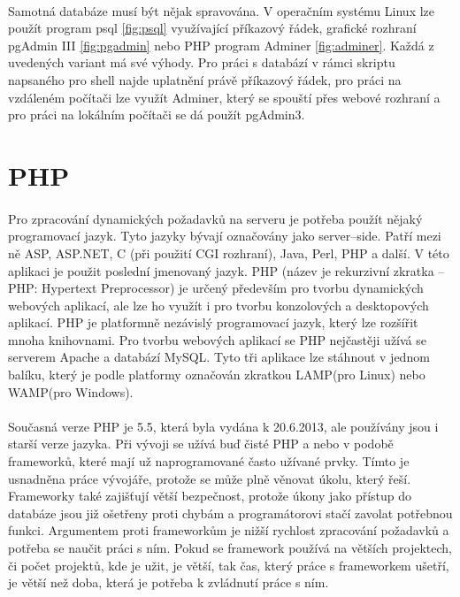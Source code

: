 \documentclass[11pt,a4paper,titlepage,oneside]{book}
\begin{document}

		\paragraph{}Samotná databáze musí být nějak spravována. V operačním systému Linux lze použít program psql \ref{fig:psql} využívající příkazový řádek, grafické rozhraní pgAdmin III \ref{fig:pgadmin} nebo PHP program Adminer \ref{fig:adminer}. Každá z uvedených variant má své výhody. Pro práci s databází v rámci skriptu napsaného pro shell najde uplatnění právě příkazový řádek, pro práci na vzdáleném počítači lze využít Adminer, který se spouští přes webové rozhraní a pro práci na lokálním počítači se dá použít pgAdmin3.




	\section{PHP}
		\paragraph{} Pro zpracování dynamických požadavků na serveru je potřeba použít nějaký programovací jazyk. Tyto jazyky bývají označovány jako server--side. Patří mezi ně ASP, ASP.NET, C (při použití CGI rozhraní), Java, Perl, PHP a další. V této aplikaci je použit poslední jmenovaný jazyk. PHP (název je rekurzivní zkratka -- PHP: Hypertext Preprocessor) je určený především pro tvorbu dynamických webových aplikací, ale lze ho využít i pro tvorbu konzolových a desktopových aplikací. PHP je platformně nezávislý programovací jazyk, který lze rozšířit mnoha knihovnami. Pro tvorbu webových aplikací se PHP nejčastěji užívá se serverem Apache a databází MySQL. Tyto tři aplikace lze stáhnout v jednom balíku, který je podle platformy označován zkratkou LAMP(pro Linux) nebo WAMP(pro Windows).


		\paragraph{} Současná verze PHP je 5.5, která byla vydána k 20.6.2013, ale používány jsou i starší verze jazyka. Při vývoji se užívá buď čisté PHP a nebo v podobě frameworků, které mají už naprogramované často užívané prvky. Tímto je usnadněna práce vývojáře, protože se může plně věnovat úkolu, který řeší. Frameworky také zajišťují větší bezpečnost, protože úkony jako přístup do databáze jsou již ošetřeny proti chybám a programátorovi stačí zavolat potřebnou funkci. Argumentem proti frameworkům je nižší rychlost zpracování požadavků a potřeba se naučit práci s ním. Pokud se framework používá na větších projektech, či počet projektů, kde je užit, je větší, tak čas, který práce s frameworkem ušetří, je větší než doba, která je potřeba k zvládnutí práce s ním.
\end{document}
